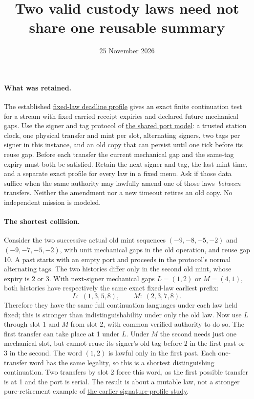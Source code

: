 \documentclass[11pt]{article}
\title{Two valid custody laws need not share one reusable summary}
\date{25 November 2026}
\begin{document}
\maketitle
\paragraph{What was retained.}
The established \href{https://github.com/eternal-november/eos-research-programmes/pull/391}{fixed-law deadline profile} gives an exact finite continuation test for a stream with fixed carried receipt expiries and declared future mechanical gaps. Use the signer and tag protocol of \href{https://github.com/eternal-november/eos-research-programmes/pull/390}{the shared port model}: a trusted station clock, one physical transfer and mint per slot, alternating signers, two tags per signer in this instance, and an old copy that can persist until one tick before its reuse gap. Before each transfer the current mechanical gap and the same-tag expiry must both be satisfied. Retain the next signer and tag, the last mint time, and a separate exact profile for every law in a fixed menu. Ask if those data suffice when the same authority may lawfully amend one of those laws \,\emph{between} transfers. Neither the amendment nor a new timeout retires an old copy. No independent mission is modeled.
\paragraph{The shortest collision.}
Consider the two successive actual old mint sequences \((-9,-8,-5,-2)\) and \((-9,-7,-5,-2)\), with unit mechanical gaps in the old operation, and reuse gap 10. A past starts with an empty port and proceeds in the protocol's normal alternating tags. The two histories differ only in the second old mint, whose expiry is 2 or 3. With next-signer mechanical gaps \(L=(1,2)\) or \(M=(4,1)\), both histories have respectively the same exact fixed-law earliest prefix:
\[
 L:\;(1,3,5,8),\qquad M:\;(2,3,7,8).
\]
Therefore they have the same full continuation languages under each law held fixed; this is stronger than indistinguishability under only the old law. Now use \(L\) through slot 1 and \(M\) from slot 2, with common verified authority to do so. The first transfer can take place at 1 under \(L\). Under \(M\) the second needs just one mechanical slot, but cannot reuse its signer's old tag before 2 in the first past or 3 in the second. The word \((1,2)\) is lawful only in the first past. Each one-transfer word has the same legality, so this is a shortest distinguishing continuation. Two transfers by slot 2 force this word, as the first possible transfer is at 1 and the port is serial. The result is about a mutable law, not a stronger pure-retirement example of \href{https://github.com/eternal-november/eos-research-programmes/pull/384}{the earlier signature-profile study}.
\end{document}
